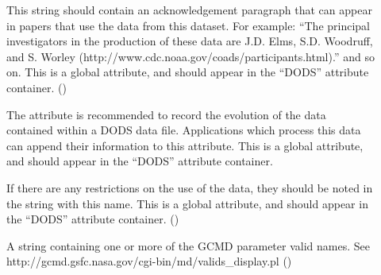 \begin{description}
  
\item[] This string should contain an acknowledgement
  paragraph that can appear in papers that use the data from this
  dataset.  For example: ``The principal investigators in the
  production of these data are J.D. Elms, S.D. Woodruff, and
  S. Worley (http://www.cdc.noaa.gov/coads/participants.html).'' and
  so on.  This is a global attribute, and should appear in the
  ``DODS'' attribute container. 
  () 
  
\item[] The  attribute is recommended to
  record the evolution of the data contained within a DODS data file.
  Applications which process this data can append their information to
  this attribute.  This is a global attribute, and should appear in
  the ``DODS'' attribute container.

\item[] If there are any restrictions on the use
  of the data, they should be noted in the string with this name.
  This is a global attribute, and should appear in the ``DODS''
  attribute container. 
  () 
  
\item[] A string containing one or more of the GCMD parameter
  valid names. See 
  {http://gcmd.gsfc.nasa.gov/cgi-bin/md/valids_display.pl} 
  ()

\end{description}

%



